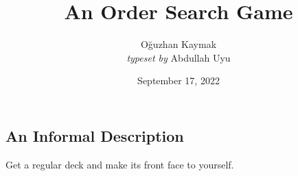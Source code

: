\documentclass[a4paper, openright, oneside]{memoir}
\title{An Order Search Game}
\date{September 17, 2022}
\author{Oğuzhan Kaymak\\
\textit{typeset by} Abdullah Uyu}
\theoremstyle{definition}
\theoremstyle{remark}
\begin{document}
\maketitle
\subsection{An Informal Description}
Get a regular deck and make its front face to yourself.
\end{document}
